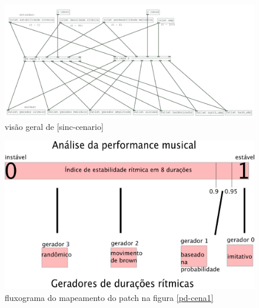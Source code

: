 \documentclass{ppgmus}
\begin{document}
\begin{figure}
\includegraphics[scale=.55]{sinc-cenario}
\caption{visão geral de [sinc-cenario]}
\label{sinc-cenario}
\end{figure}

\begin{figure}
\includegraphics[scale=.6]{tabela-cenario}
\caption{fluxograma do mapeamento do patch na figura \ref{pd-cena1}}
\label{tabela-cenario}
\end{figure}
\end{document}
